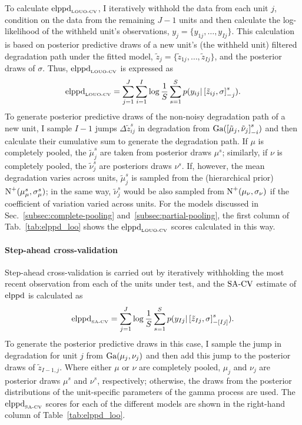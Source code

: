To calculate $\hbox{elppd}_{\hbox{\tiny{LOUO-CV}}}$, I iteratively withhold the data from each unit $j$, condition on the data from the remaining $J-1$ units and then calculate the log-likelihood of the withheld unit's observations, $y_{j} = \{y_{1j}, \ldots, y_{Ij}\}$. This calculation is based on posterior predictive draws of a new unit's (the withheld unit) filtered degradation path under the fitted model, $\tilde{z}_{j} = \{\tilde{z}_{1j}, \ldots, \tilde{z}_{Ij}\}$, and the posterior draws of $\sigma$. Thus, $\hbox{elppd}_{\hbox{\tiny{LOUO-CV}}}$ is expressed as
\begin{equation} \label{eq:elppd_louo}
 \hbox{elppd}_{\hbox{\tiny{LOUO-CV}}} = \sum^J_{j = 1}\sum^{I}_{i = 1} \log \frac{1}{S} \sum^S_{s = 1} p(y_{ij} | \left[\Tilde{z}_{ij}, \sigma \right]_{-j}^s).
\end{equation}
To generate posterior predictive draws of the non-noisy degradation path of a new unit, I sample $I-1$ jumps $\Delta\tilde{z}^s_{ij}$ in degradation from $\hbox{Ga}(\left[\tilde{\mu}_j, \tilde{\nu}_j\right]_{-i}^s)$ and then calculate their cumulative sum to generate the degradation path. If $\mu$ is completely pooled, the $\tilde{\mu}^s_j$ are taken from posterior draws $\mu^s$; similarly, if $\nu$ is completely pooled, the $\tilde{\nu}^s_j$ are posteriors draws $\nu^s$. If, however, the mean degradation varies across units, $\tilde{\mu}^s_j$ is sampled from the (hierarchical prior) $\hbox{N}^{+}(\mu^s_\mu, \sigma^s_\mu)$; in the same way, $\tilde{\nu}^s_j$ would be also sampled from $\hbox{N}^{+}(\mu_\nu, \sigma_\nu)$ if the coefficient of variation varied across units. For the models discussed in Sec.~\ref{subsec:complete-pooling} and~\ref{subsec:partial-pooling}, the first column of Tab.~\ref{tab:elppd_loo} shows the $\hbox{elppd}_{\hbox{\tiny{LOUO-CV}}}$ scores calculated in this way.

\paragraph{Step-ahead cross-validation}

Step-ahead cross-validation is carried out by iteratively withholding the most recent observation from each of the units under test, and the $\hbox{SA-CV}$ estimate of $\hbox{elppd}$ is calculated as
\begin{equation} \label{eq:elppd_sa_cv}
 \hbox{elppd}_{\hbox{\tiny{SA-CV}}} = \sum^{J}_{j = 1} \log \frac{1}{S} \sum^S_{s = 1} p(y_{Ij} | \left[\tilde{z}_{Ij}, \sigma \right]_{-\left[ Ij \right]}^s).
\end{equation}
To generate the posterior predictive draws in this case, I sample the jump in degradation for unit $j$ from $\hbox{Ga}(\mu_j, \nu_j)$ and then add this jump to the posterior draws of $\tilde{z}_{I-1,j}$. Where either $\mu$ or $\nu$ are completely pooled, $\mu_j$ and $\nu_j$ are posterior draws $\mu^s$ and $\nu^s$, respectively; otherwise, the draws from the posterior distributions of the unit-specific parameters of the gamma process are used. The $\hbox{elppd}_{\hbox{\tiny{SA-CV}}}$ scores for each of the different models are shown in the right-hand column of Table~\ref{tab:elppd_loo}.

